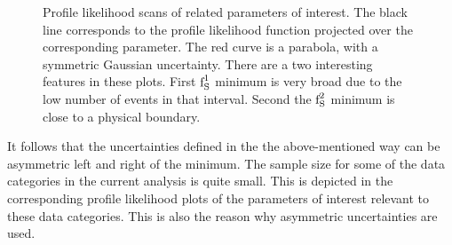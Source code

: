 \begin{figure}[!t]
  \centering
  \begin{subfigure}{0.5\textwidth}
    \raggedright
    \scalebox{0.56}{}
    \caption{}
    \label{nll_ASMag2_bin1}
  \end{subfigure}%
  \hfill%
  \begin{subfigure}{0.5\textwidth}
    \raggedleft
    \scalebox{0.56}{}
    \caption{}
    \label{nll_ASPhase_bin1}
  \end{subfigure}
  \begin{subfigure}{0.5\textwidth}
    \raggedright
    \scalebox{0.56}{}
    \caption{}
    \label{nll_ASMag2_bin2}
  \end{subfigure}%
  \hfill%
  \begin{subfigure}{0.5\textwidth}
    \raggedleft
    \scalebox{0.56}{}
    \caption{}
    \label{nll_ASPhase_bin2}
  \end{subfigure}
  \caption{Profile likelihood scans of \swave related parameters of interest. The black line corresponds to the profile likelihood
         function projected over the corresponding parameter. The red curve is a parabola, with a symmetric Gaussian
         uncertainty. There are a two interesting features in these plots. First $\text{f}_{\text{S}}^{1}$ minimum is very broad due to the
         low number of events in that \mkpi interval. Second the $\text{f}_{\text{S}}^{2}$ minimum is close to a physical boundary.}
\end{figure}

It follows that the uncertainties defined in the the above-mentioned way can be asymmetric left and right of the minimum.
The sample size for some of the data categories in the current analysis is quite small. This is depicted in the corresponding profile
likelihood plots of the parameters of interest relevant to these data categories. This is also the reason why asymmetric uncertainties
are used.

